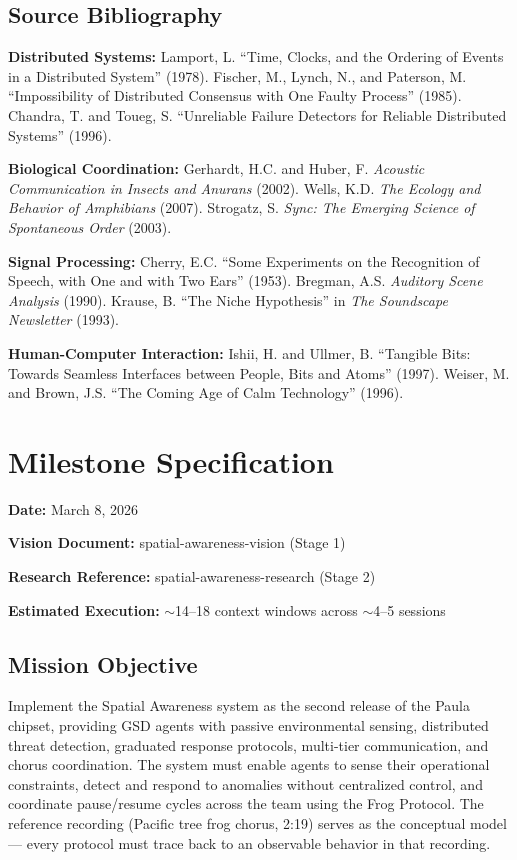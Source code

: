 \documentclass[11pt,letterpaper]{article}
\newcommand{\stageheader}[2]{%
  \noindent\colorbox{#2}{\makebox[\textwidth][l]{%
    \textcolor{white}{\bfseries\sffamily\hspace{6pt}#1\hspace{6pt}}}}%
  \vspace{0.5em}\par%
}
\newcommand{\metafield}[2]{\textbf{\sffamily #1} #2\par}
\begin{document}
\subsection{Source Bibliography}

\textbf{Distributed Systems:} Lamport, L. ``Time, Clocks, and the Ordering of Events in a Distributed System'' (1978). Fischer, M., Lynch, N., and Paterson, M. ``Impossibility of Distributed Consensus with One Faulty Process'' (1985). Chandra, T. and Toueg, S. ``Unreliable Failure Detectors for Reliable Distributed Systems'' (1996).

\textbf{Biological Coordination:} Gerhardt, H.C. and Huber, F. \textit{Acoustic Communication in Insects and Anurans} (2002). Wells, K.D. \textit{The Ecology and Behavior of Amphibians} (2007). Strogatz, S. \textit{Sync: The Emerging Science of Spontaneous Order} (2003).

\textbf{Signal Processing:} Cherry, E.C. ``Some Experiments on the Recognition of Speech, with One and with Two Ears'' (1953). Bregman, A.S. \textit{Auditory Scene Analysis} (1990). Krause, B. ``The Niche Hypothesis'' in \textit{The Soundscape Newsletter} (1993).

\textbf{Human-Computer Interaction:} Ishii, H. and Ullmer, B. ``Tangible Bits: Towards Seamless Interfaces between People, Bits and Atoms'' (1997). Weiser, M. and Brown, J.S. ``The Coming Age of Calm Technology'' (1996).

\newpage

\stageheader{STAGE 3 --- MISSION PACKAGE}{tertiary}

\section{Milestone Specification}

\metafield{Date:}{March 8, 2026}
\metafield{Vision Document:}{spatial-awareness-vision (Stage 1)}
\metafield{Research Reference:}{spatial-awareness-research (Stage 2)}
\metafield{Estimated Execution:}{$\sim$14--18 context windows across $\sim$4--5 sessions}

\subsection{Mission Objective}

Implement the Spatial Awareness system as the second release of the Paula chipset, providing GSD agents with passive environmental sensing, distributed threat detection, graduated response protocols, multi-tier communication, and chorus coordination. The system must enable agents to sense their operational constraints, detect and respond to anomalies without centralized control, and coordinate pause/resume cycles across the team using the Frog Protocol. The reference recording (Pacific tree frog chorus, 2:19) serves as the conceptual model --- every protocol must trace back to an observable behavior in that recording.
\end{document}
